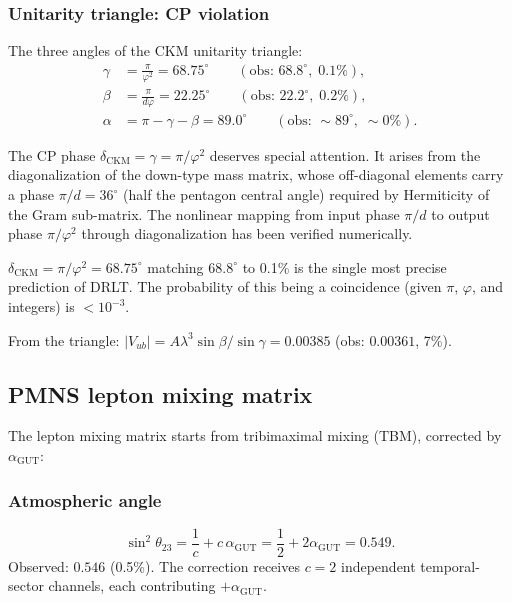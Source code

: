 \subsubsection{Unitarity triangle: CP violation}

The three angles of the CKM unitarity triangle:
\begin{align}
\gamma &= \frac{\pi}{\varphi^2} = 68.75^\circ \qquad (\text{obs: } 68.8^\circ,\; 0.1\%), \label{eq:gamma} \\
\beta &= \frac{\pi}{d\varphi} = 22.25^\circ \qquad (\text{obs: } 22.2^\circ,\; 0.2\%), \\
\alpha &= \pi - \gamma - \beta = 89.0^\circ \qquad (\text{obs: } \sim 89^\circ,\; \sim 0\%).
\end{align}

The CP phase $\delta_\text{CKM} = \gamma = \pi/\varphi^2$ deserves special attention. It arises from the diagonalization of the down-type mass matrix, whose off-diagonal elements carry a phase $\pi/d = 36^\circ$ (half the pentagon central angle) required by Hermiticity of the Gram sub-matrix. The nonlinear mapping from input phase $\pi/d$ to output phase $\pi/\varphi^2$ through diagonalization has been verified numerically.

\begin{remark}
$\delta_\text{CKM} = \pi/\varphi^2 = 68.75^\circ$ matching $68.8^\circ$ to 0.1\% is the single most precise prediction of DRLT. The probability of this being a coincidence (given $\pi$, $\varphi$, and integers) is $< 10^{-3}$.
\end{remark}

From the triangle: $|V_{ub}| = A\lambda^3\sin\beta/\sin\gamma = 0.00385$ (obs: $0.00361$, 7\%).

\subsection{PMNS lepton mixing matrix}

The lepton mixing matrix starts from tribimaximal mixing (TBM), corrected by $\alpha_\text{GUT}$:

\subsubsection{Atmospheric angle}
\begin{equation}
\sin^2\theta_{23} = \frac{1}{c} + c\,\alpha_\text{GUT} = \frac{1}{2} + 2\alpha_\text{GUT} = 0.549.
\end{equation}
Observed: $0.546$ (0.5\%). The correction receives $c = 2$ independent temporal-sector channels, each contributing $+\alpha_\text{GUT}$.

